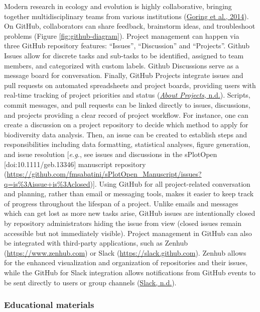 Modern research in ecology and evolution is highly collaborative, bringing together multidisciplinary teams from various institutions (\protect\hyperlink{ref-1HhzKAC1K}{Goring et al., 2014}).
On GitHub, collaborators can share feedback, brainstorm ideas, and troubleshoot problems (Figure \ref{fig:github-diagram}).
Project management can happen via three GitHub repository features: ``Issues'', ``Discussion'' and ``Projects''.
Github Issues allow for discrete tasks and sub-tasks to be identified, assigned to team members, and categorized with custom labels.
Github Discussions serve as a message board for conversation.
Finally, GitHub Projects integrate issues and pull requests on automated spreadsheets and project boards, providing users with real-time tracking of project priorities and status (\protect\hyperlink{ref-RhBKe0MG}{\emph{About Projects}, n.d.}).
Scripts, commit messages, and pull requests can be linked directly to issues, discussions, and projects providing a clear record of project workflow.
For instance, one can create a discussion on a project repository to decide which method to apply for biodiversity data analysis.
Then, an issue can be created to establish steps and responsibilities including data formatting, statistical analyses, figure generation, and issue resolution {[}\emph{e.g.}, see issues and discussions in the sPlotOpen {[}doi:10.1111/geb.13346{]} manuscript repository (\url{https://github.com/fmsabatini/sPlotOpen_Manuscript/issues?q=is\%3Aissue+is\%3Aclosed}){]}.
Using GitHub for all project-related conversation and planning, rather than email or messaging tools, makes it easier to keep track of progress throughout the lifespan of a project.
Unlike emails and messages which can get lost as more new tasks arise, GitHub issues are intentionally closed by repository administrators hiding the issue from view (closed issues remain accessible but not immediately visible).
Project management in GitHub can also be integrated with third-party applications, such as Zenhub (\url{https://www.zenhub.com}) or Slack (\url{https://slack.github.com}).
Zenhub allows for the enhanced visualization and organization of repositories and their issues, while the GitHub for Slack integration allows notifications from GitHub events to be sent directly to users or group channels (\protect\hyperlink{ref-1GRWGlDWy}{Slack, n.d.}).

\hypertarget{educational-materials}{%
\subsubsection{Educational materials}\label{educational-materials}}

